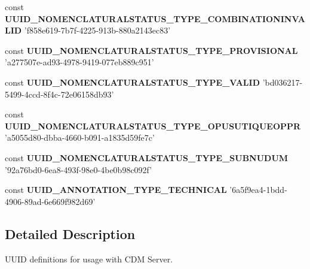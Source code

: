 \begin{DoxyCompactItemize}
\item 
\hypertarget{uuids_8php_a32b0c376e8cbc5f4ae7cad53a0feedc7}{const {\bfseries U\-U\-I\-D\-\_\-\-N\-O\-M\-E\-N\-C\-L\-A\-T\-U\-R\-A\-L\-S\-T\-A\-T\-U\-S\-\_\-\-T\-Y\-P\-E\-\_\-\-C\-O\-M\-B\-I\-N\-A\-T\-I\-O\-N\-I\-N\-V\-A\-L\-I\-D} 'f858e619-\/7b7f-\/4225-\/913b-\/880a2143ec83'}\label{uuids_8php_a32b0c376e8cbc5f4ae7cad53a0feedc7}

\item 
\hypertarget{uuids_8php_adbcd6832484951b2396664b659f5c060}{const {\bfseries U\-U\-I\-D\-\_\-\-N\-O\-M\-E\-N\-C\-L\-A\-T\-U\-R\-A\-L\-S\-T\-A\-T\-U\-S\-\_\-\-T\-Y\-P\-E\-\_\-\-P\-R\-O\-V\-I\-S\-I\-O\-N\-A\-L} 'a277507e-\/ad93-\/4978-\/9419-\/077eb889c951'}\label{uuids_8php_adbcd6832484951b2396664b659f5c060}

\item 
\hypertarget{uuids_8php_a2fc20c10e38e6e1abb9714a46bac81dc}{const {\bfseries U\-U\-I\-D\-\_\-\-N\-O\-M\-E\-N\-C\-L\-A\-T\-U\-R\-A\-L\-S\-T\-A\-T\-U\-S\-\_\-\-T\-Y\-P\-E\-\_\-\-V\-A\-L\-I\-D} 'bd036217-\/5499-\/4ccd-\/8f4c-\/72e06158db93'}\label{uuids_8php_a2fc20c10e38e6e1abb9714a46bac81dc}

\item 
\hypertarget{uuids_8php_a37770f78e65f9cbbb96a78c409dffe2f}{const {\bfseries U\-U\-I\-D\-\_\-\-N\-O\-M\-E\-N\-C\-L\-A\-T\-U\-R\-A\-L\-S\-T\-A\-T\-U\-S\-\_\-\-T\-Y\-P\-E\-\_\-\-O\-P\-U\-S\-U\-T\-I\-Q\-U\-E\-O\-P\-P\-R} 'a5055d80-\/dbba-\/4660-\/b091-\/a1835d59fe7c'}\label{uuids_8php_a37770f78e65f9cbbb96a78c409dffe2f}

\item 
\hypertarget{uuids_8php_a1bc7a7b7fcccc02d49f2fb5b12588723}{const {\bfseries U\-U\-I\-D\-\_\-\-N\-O\-M\-E\-N\-C\-L\-A\-T\-U\-R\-A\-L\-S\-T\-A\-T\-U\-S\-\_\-\-T\-Y\-P\-E\-\_\-\-S\-U\-B\-N\-U\-D\-U\-M} '92a76bd0-\/6ea8-\/493f-\/98e0-\/4be0b98c092f'}\label{uuids_8php_a1bc7a7b7fcccc02d49f2fb5b12588723}

\item 
\hypertarget{uuids_8php_aebb9d03d48e7e7ddc67305ef70f5b104}{const {\bfseries U\-U\-I\-D\-\_\-\-A\-N\-N\-O\-T\-A\-T\-I\-O\-N\-\_\-\-T\-Y\-P\-E\-\_\-\-T\-E\-C\-H\-N\-I\-C\-A\-L} '6a5f9ea4-\/1bdd-\/4906-\/89ad-\/6e669f982d69'}\label{uuids_8php_aebb9d03d48e7e7ddc67305ef70f5b104}

\end{DoxyCompactItemize}


\subsection{Detailed Description}
U\-U\-I\-D definitions for usage with C\-D\-M Server. 